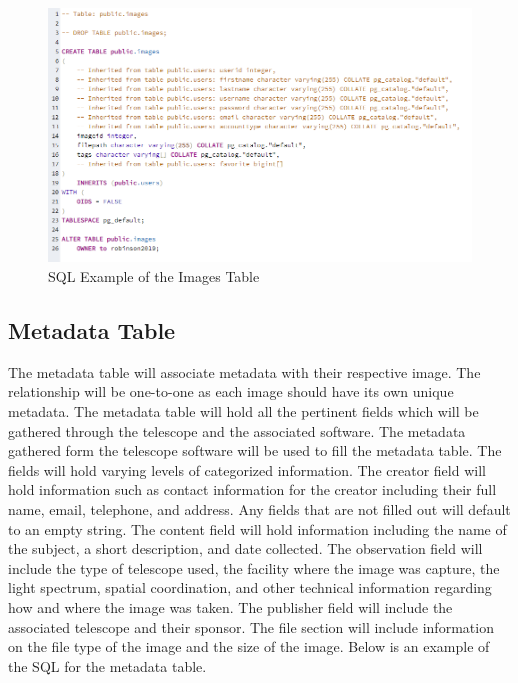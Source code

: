 \documentclass[12pt]{article}
\begin{document}
\begin{figure}[h]
	\centering
	\includegraphics[width=\linewidth]{database_images_table}
	\caption{SQL Example of the Images Table}
	\label{fig:SQL Images Table}
\end{figure}

\subsection{Metadata Table}

The metadata table will associate metadata with their respective image.  The relationship will be one-to-one as each image should have its own unique metadata.  The metadata table will hold all the pertinent fields which will be gathered through the telescope and the associated software.  The metadata gathered form the telescope software will be used to fill the metadata table.  The fields will hold varying levels of categorized information.  The creator field will hold information such as contact information for the creator including their full name, email, telephone, and address.  Any fields that are not filled out will default to an empty string.  The content field will hold information including the name of the subject, a short description, and date collected.  The observation field will include the type of telescope used, the facility where the image was capture, the light spectrum, spatial coordination, and other technical information regarding how and where the image was taken.  The publisher field will include the associated telescope and their sponsor.  The file section will include information on the file type of the image and the size of the image.  Below is an example of the SQL for the metadata table.
\end{document}
